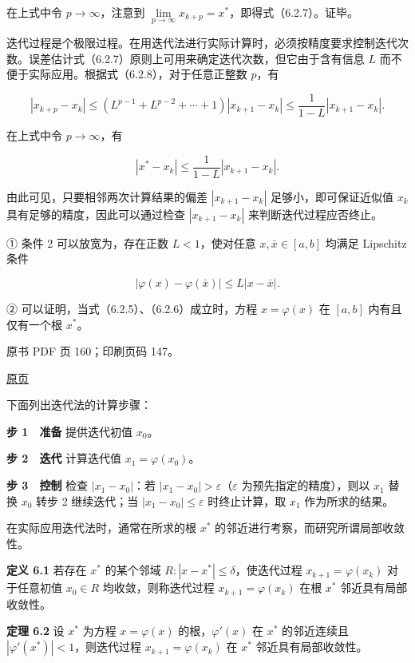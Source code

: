 在上式中令 \(p\to\infty\)，注意到 \(\lim\limits_{p\to\infty}x_{k+p}=x^*\)，即得式（6.2.7）。证毕。

迭代过程是个极限过程。在用迭代法进行实际计算时，必须按精度要求控制迭代次数。误差估计式（6.2.7）原则上可用来确定迭代次数，但它由于含有信息 \(L\) 而不便于实际应用。根据式（6.2.8），对于任意正整数 \(p\)，有

\[
|x_{k+p}-x_k|\leqslant(L^{p-1}+L^{p-2}+\cdots+1)|x_{k+1}-x_k|\leqslant\frac{1}{1-L}|x_{k+1}-x_k|.
\]

在上式中令 \(p\to\infty\)，有

\[
|x^*-x_k|\leqslant\frac{1}{1-L}|x_{k+1}-x_k|.
\]

由此可见，只要相邻两次计算结果的偏差 \(|x_{k+1}-x_k|\) 足够小，即可保证近似值 \(x_k\) 具有足够的精度，因此可以通过检查 \(|x_{k+1}-x_k|\) 来判断迭代过程应否终止。

① 条件 2 可以放宽为，存在正数 \(L<1\)，使对任意 \(x,\bar{x}\in[a,b]\) 均满足 Lipschitz 条件

\[
|\varphi(x)-\varphi(\bar{x})|\leqslant L|x-\bar{x}|.
\]

② 可以证明，当式（6.2.5）、（6.2.6）成立时，方程 \(x=\varphi(x)\) 在 \([a,b]\) 内有且仅有一个根 \(x^*\)。

\clearpage

原书 PDF 页 160；印刷页码 147。

\href{source-images/pdf-160.jpeg}{原页}

下面列出迭代法的计算步骤：

\textbf{步 1　准备} 提供迭代初值 \(x_0\)。

\textbf{步 2　迭代} 计算迭代值 \(x_1=\varphi(x_0)\)。

\textbf{步 3　控制} 检查 \(|x_1-x_0|\)：若 \(|x_1-x_0|>\varepsilon\)（\(\varepsilon\) 为预先指定的精度），则以 \(x_1\) 替换 \(x_0\) 转步 2 继续迭代；当 \(|x_1-x_0|\leqslant\varepsilon\) 时终止计算，取 \(x_1\) 作为所求的结果。

在实际应用迭代法时，通常在所求的根 \(x^*\) 的邻近进行考察，而研究所谓局部收敛性。

\textbf{定义 6.1} 若存在 \(x^*\) 的某个邻域 \(R:|x-x^*|\leqslant\delta\)，使迭代过程 \(x_{k+1}=\varphi(x_k)\) 对于任意初值 \(x_0\in R\) 均收敛，则称迭代过程 \(x_{k+1}=\varphi(x_k)\) 在根 \(x^*\) 邻近具有局部收敛性。

\textbf{定理 6.2} 设 \(x^*\) 为方程 \(x=\varphi(x)\) 的根，\(\varphi'(x)\) 在 \(x^*\) 的邻近连续且 \(|\varphi'(x^*)|<1\)，则迭代过程 \(x_{k+1}=\varphi(x_k)\) 在 \(x^*\) 邻近具有局部收敛性。

